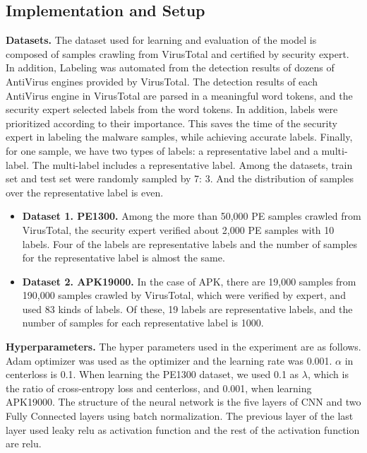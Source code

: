 \subsection{Implementation and Setup}
\textbf{Datasets. } 
The dataset used for learning and evaluation of the model is composed of samples crawling from VirusTotal\cite{total2012virustotal} and certified by security expert. In addition, Labeling was automated from the detection results of dozens of AntiVirus engines provided by VirusTotal. The detection results of each AntiVirus engine in VirusTotal are parsed in a meaningful word tokens, and the security expert selected labels from the word tokens. In addition, labels were prioritized according to their importance. This saves the time of the security expert in labeling the malware samples, while achieving accurate labels. Finally, for one sample, we have two types of labels: a representative label and a multi-label. The multi-label includes a representative label. Among the datasets, train set and test set were randomly sampled by 7: 3. And the distribution of samples over the representative label is even.

\begin{itemize}
	\item{ \textbf{Dataset 1. PE1300. } Among the more than 50,000 PE samples crawled from VirusTotal, the security expert verified about 2,000 PE samples with 10 labels. Four of the labels are representative labels and the number of samples for the representative label is almost the same.
	}
	\item{ \textbf{Dataset 2. APK19000. } In the case of APK, there are 19,000 samples from 190,000 samples crawled by VirusTotal, which were verified by expert, and used 83 kinds of labels. Of these, 19 labels are representative labels, and the number of samples for each representative label is 1000.
	}
\end{itemize}

\textbf{Hyperparameters. }
The hyper parameters used in the experiment are as follows. Adam optimizer\cite{kingma2014adam} was used as the optimizer and the learning rate was 0.001. $\alpha$ in centerloss is 0.1. When learning the PE1300 dataset, we used 0.1 as $\lambda$, which is the ratio of cross-entropy loss and centerloss, and 0.001, when learning APK19000. The structure of the neural network is the five layers of CNN and two Fully Connected layers using batch normalization\cite{ioffe2015batch}. The previous layer of the last layer used leaky relu\cite{xu2015empirical} as activation function and the rest of the activation function are relu\cite{nair2010rectified}. 

